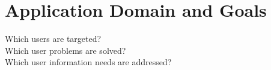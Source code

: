 \section{Application Domain and Goals}
Which users are targeted? \\
Which user problems are solved? \\
Which user information needs are addressed?
